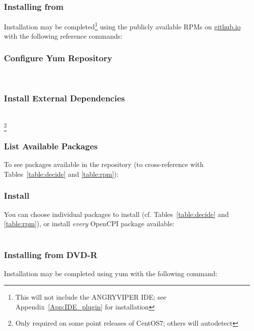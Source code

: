 \subsubsection{Installing from }
Installation may be completed\footnote{This will not include the ANGRYVIPER IDE; see Appendix~\ref{App:IDE_plugin} for installation} using the publicly available RPMs on \href{https://opencpi.github.io/}{github.io} with the following reference commands:
\subsubsection*{Configure Yum Repository}
\\

\subsubsection*{Install External Dependencies}
\\
\footnote{Only required on some point releases of CentOS7; others will autodetect} %

\subsubsection*{List Available Packages}
To see packages available in the repository (to cross-reference with Tables~\ref{table:decide} and \ref{table:rpm}):\\

\subsubsection*{Install}
You can choose individual packages to install (cf. Tables~\ref{table:decide} and \ref{table:rpm}), or install \textit{every} OpenCPI package available:\\
\\

\subsubsection{Installing from DVD-R}
Installation may be completed using yum with the following command:\\

